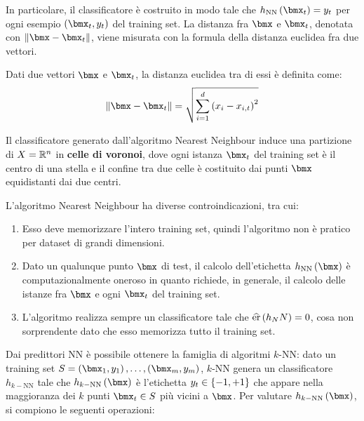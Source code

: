 \documentclass[\main/main.tex]{subfiles}
\begin{document}
\begin{multicols}{2}
\begin{definition}
        In particolare, il classificatore è costruito in modo tale che \(\hNN{\bmx_t} = y_t\) per ogni esempio \(\rnd{\bmx_t, y_t}\) del training set. La distanza fra \(\bmx\) e \(\bmx_t\), denotata con \(\norm{\bmx - \bmx_t}\), viene misurata con la formula della distanza euclidea fra due vettori.
    \end{definition}
    \begin{definition}
        Dati due vettori \(\bmx\) e \(\bmx_t\), la distanza euclidea tra di essi è definita come:
        \[
            \norm{\bmx - \bmx_t} = \sqrt{\sum_{i=1}^d\rnd{x_i - x_{i,t}}^2}
        \]
    \end{definition}
    \begin{definition}
        Il classificatore generato dall'algoritmo Nearest Neighbour induce una partizione di \(X = \mathbb{R}^n\) in \textbf{celle di voronoi}, dove ogni istanza \(\bmx_t\) del training set è il centro di una stella e il confine tra due celle è costituito dai punti \(\bmx\) equidistanti dai due centri.
    \end{definition}
    \begin{observation}
        L'algoritmo Nearest Neighbour ha diverse controindicazioni, tra cui:
        \begin{enumerate}
            \item Esso deve memorizzare l'intero training set, quindi l'algoritmo non è pratico per dataset di grandi dimensioni.
            \item Dato un qualunque punto \(\bmx\) di test, il calcolo dell'etichetta \(\hNN{\bmx}\) è computazionalmente oneroso in quanto richiede, in generale, il calcolo delle istanze fra \(\bmx\) e ogni \(\bmx_t\) del training set.
            \item L'algoritmo realizza sempre un classificatore tale che \(\widehat{\text{er}}\left(h_NN\right) = 0\), cosa non sorprendente dato che esso memorizza tutto il training set.
        \end{enumerate}
    \end{observation}
    \begin{definition}[Algoritmi \(k\)-NN]
        Dai predittori NN è possibile ottenere la famiglia di algoritmi \(k\)-NN: dato un training set \(S = \examples{m}\), \(k\)-NN genera un classificatore \(h_{k-\text{NN}}\) tale che \(\hkNN{\bmx}\) è l'etichetta \(y_t \in \left\{-1, +1\right\}\) che appare nella maggioranza dei \(k\) punti \(\bmx_t \in S\) più vicini a \(\bmx\). Per valutare \(\hkNN{\bmx}\), si compiono le seguenti operazioni:

\end{definition}
\end{multicols}
\end{document}
